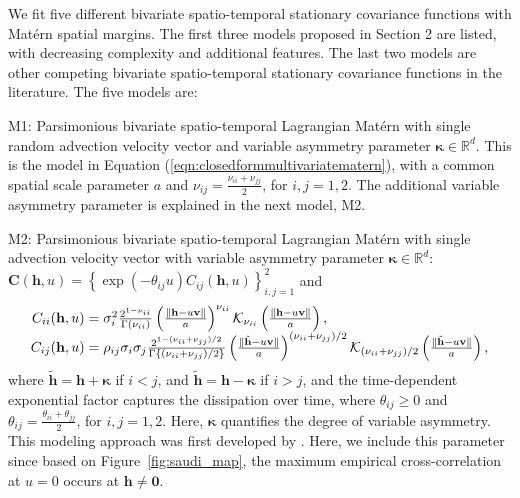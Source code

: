\documentclass[12pt]{article}
\newcommand{\0}{\mathbf{0}}
\begin{document}
We fit five different bivariate spatio-temporal stationary covariance functions with Mat\'{e}rn spatial margins. The first three models proposed in Section 2 are listed, with decreasing complexity and additional features. The last two models are other competing bivariate spatio-temporal stationary covariance functions in the literature. The five models are:
\begin{compactitem}
\item M1: Parsimonious bivariate spatio-temporal Lagrangian Mat\'{e}rn with single random advection velocity vector and variable asymmetry parameter $\boldsymbol{\kappa}\in \mathbb{R}^d$. This is the model in Equation (\ref{eqn:closedformmultivariatematern}), with a common spatial scale parameter $a$ and $\nu_{ij}=\frac{\nu_{ii}+\nu_{jj}}{2}$, for $i,j=1,2$. The additional variable asymmetry parameter is explained in the next model, M2.

\item M2: Parsimonious bivariate spatio-temporal Lagrangian Mat\'{e}rn with single advection velocity vector with variable asymmetry parameter $\boldsymbol{\kappa}\in \mathbb{R}^d$: $\mathbf{C}(\mathbf{h},u)=\left\{\exp(-\theta_{ij}u)C_{ij}(\mathbf{h},u)\right\}_{i,j=1}^{2}$ and
\begin{equation}
\begin{array}{r@{}l}
    C_{ii}(\mathbf{h},u) &{}= \sigma_{i}^{2}\frac{2^{1-\nu_{ii}}}{\Gamma(\nu_{ii})}\left(\frac{\|\mathbf{h}-u\mathbf{v}\|}{a}\right)^{\nu_{ii}}\mathcal{K}_{\nu_{ii}}\left(\frac{\|\mathbf{h}-u\mathbf{v}\|}{a}\right),\\
    C_{ij}(\mathbf{h},u)&{}= \rho_{ij} \sigma_{i}\sigma_{j}\frac{2^{1-(\nu_{ii}+\nu_{jj})/2}}{\Gamma\left\{(\nu_{ii}+\nu_{jj})/2\right\}}\left(\frac{\|\tilde{\mathbf{h}}-u\mathbf{v}\|}{a}\right)^{(\nu_{ii}+\nu_{jj})/2}\mathcal{K}_{(\nu_{ii}+\nu_{jj})/2}\left(\frac{\|\tilde{\mathbf{h}}-u\mathbf{v}\|}{a}\right),
\end{array}
\end{equation}
where $\tilde{\mathbf{h}}=\mathbf{h}+\boldsymbol{\kappa}$ if $i<j$, and $\tilde{\mathbf{h}}=\mathbf{h}-\boldsymbol{\kappa}$ if $i>j$, and the time-dependent exponential factor captures the dissipation over time, where $\theta_{ij}\geq 0$ and $\theta_{ij}=\frac{\theta_{ii}+\theta_{jj}}{2}$, for $i,j=1,2$. Here, $\boldsymbol{\kappa}$ quantifies the degree of variable asymmetry. This modeling approach was first developed by \citet{li2011approach}. Here, we include this parameter since based on Figure~\ref{fig:saudi_map}, the maximum empirical cross-correlation at $u=0$ occurs at $\mathbf{h}\neq \mathbf{0}.$
 

\end{compactitem}
\end{document}

